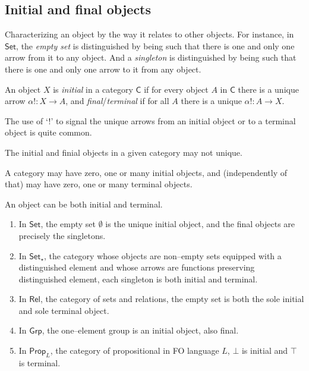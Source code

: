 \subsection{Initial and final objects}


Characterizing an object by the way it relates to other objects. 
% 
For instance, 
in $\mathsf{Set}$, 
the \textit{empty set} is distinguished by being such that there is one and only one arrow from it to any object. 
And a \textit{singleton} is distinguished by being such that there is one and only one arrow to it from any object.




\begin{df}
	An object $X$ is \textit{initial} in a category $\mathsf{C}$ if for every object $A$ in $\mathsf{C}$ there is a unique arrow $\alpha! \colon X \to A$, 
	and \textit{final}/\textit{terminal} if for all $A$ there is a unique $\alpha! \colon A \to X$.
\end{df}





\begin{remark}
	The use of `!' to signal the unique arrows from an initial object or to a terminal object is quite common. 

	The initial and finial objects in a given category may not unique.	

	A category may have zero, one or many initial objects, 
	and (independently of that) may have zero, one or many terminal objects.

	An object can be both initial and terminal.
\end{remark}



\begin{example}
	\begin{enumerate}[itemsep=5pt,parsep=5pt,leftmargin=3em,topsep=5pt,label=(\alph*)] %
		\item 
		In $\mathsf{Set}$, 
		the empty set $\emptyset$ is the {\color{teal} unique initial object}, 
		and the final objects are precisely the singletons. 

		\item 
		In $\mathsf{Set}_\star$, 
		the category whose objects are non--empty sets equipped with a distinguished element and whose arrows are functions preserving distinguished element,
		each singleton is both initial and terminal.

		\item 
		In $\mathsf{Rel}$, 
		the category of sets and relations, 
		the empty set is both the sole initial and sole terminal object.


		\item 
		In $\mathsf{Grp}$, 
		the one--element group is an initial object, 
		also final.


		\item 
		In $\mathsf{Prop}_L$, 
		the category of propositional in FO language $L$, 
		$\bot$ is initial and $\top$ is terminal.
	\end{enumerate}
\end{example}




